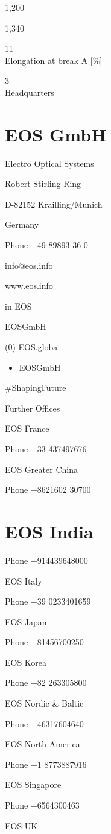 \documentclass[10pt]{article}
\begin{document}
1,200

1,340

11\\
Elongation at break A [\%]

3\\
Headquarters

\section*{EOS GmbH}
Electro Optical Systems

Robert-Stirling-Ring

D-82152 Krailling/Munich

Germany

Phone +49 89893 36-0

\href{mailto:info@eos.info}{info@eos.info}

\href{http://www.eos.info}{www.eos.info}

in EOS

EOSGmbH

(0) EOS.globa

\begin{itemize}
  \item EOSGmbH
\end{itemize}

\#ShapingFuture

Further Offices

EOS France

Phone +33 437497676

EOS Greater China

Phone +8621602 30700

\section*{EOS India}
Phone +914439648000

EOS Italy

Phone +39 0233401659

EOS Japan

Phone +81456700250

EOS Korea

Phone +82 263305800

EOS Nordic \& Baltic

Phone +46317604640

EOS North America

Phone +1 8773887916

EOS Singapore

Phone +6564300463

EOS UK
\end{document}
